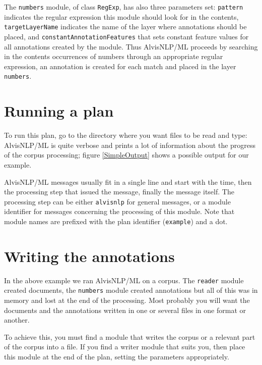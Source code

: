 \documentclass[a4paper]{book}
\begin{document}
The \texttt{numbers} module, of class \texttt{RegExp}, has also three parameters set: \texttt{pattern} indicates the regular expression this module should look for in the contents, \texttt{targetLayerName} indicates the name of the layer where annotations should be placed, and \texttt{constantAnnotationFeatures} that sets constant feature values for all annotations created by the module.
Thus AlvisNLP/ML proceeds by searching in the contents occurrences of numbers through an appropriate regular expression, an annotation is created for each match and placed in the layer \texttt{numbers}.

\section{Running a plan}

To run this plan, go to the directory where you want files to be read and type:
AlvisNLP/ML is quite verbose and prints a lot of information about the progress of the corpus processing; figure \ref{SimpleOutput} shows a possible output for our example.


AlvisNLP/ML messages usually fit in a single line and start with the time, then the processing step that issued the message, finally the message itself.
The processing step can be either \texttt{alvisnlp} for general messages, or a module identifier for messages concerning the processing of this module.
Note that module names are prefixed with the plan identifier (\texttt{example}) and a dot.

\section{Writing the annotations}
In the above example we ran AlvisNLP/ML on a corpus.
The \texttt{reader} module created documents, the \texttt{numbers} module created annotations but all of this was in memory and lost at the end of the processing.
Most probably you will want the documents and the annotations written in one or several files in one format or another.

To achieve this, you must find a module that writes the corpus or a relevant part of the corpus into a file.
If you find a writer module that suits you, then place this module at the end of the plan, setting the parameters appropriately.
\end{document}
